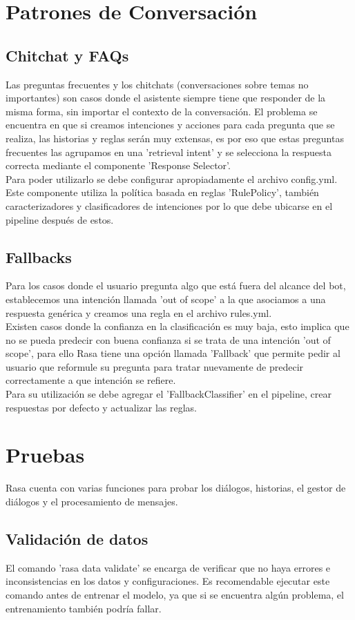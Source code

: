 \section{Patrones de Conversación}
\subsection{Chitchat y FAQs}
Las preguntas frecuentes y los chitchats (conversaciones sobre temas no importantes) son casos
donde el asistente siempre tiene que responder de la misma forma, sin importar el contexto de la
conversación. El problema se encuentra en que si creamos intenciones y acciones para cada pregunta
que se realiza, las historias y reglas serán muy extensas, es por eso que estas preguntas
frecuentes las agrupamos en una 'retrieval intent' y se selecciona la respuesta correcta mediante
el componente 'Response Selector'.\\
Para poder utilizarlo se debe configurar apropiadamente el archivo config.yml. Este componente
utiliza la política basada en reglas 'RulePolicy', también caracterizadores y clasificadores de
intenciones por lo que debe ubicarse en el pipeline después de estos.
\subsection{Fallbacks}
Para los casos donde el usuario pregunta algo que está fuera del alcance del bot, establecemos una
intención llamada 'out of scope' a la que asociamos a una respuesta genérica y creamos una regla en
el archivo rules.yml.\\ Existen casos donde la confianza en la clasificación es muy baja, esto
implica que no se pueda predecir con buena confianza si se trata de una intención 'out of scope',
para ello Rasa tiene una opción llamada 'Fallback' que permite pedir al usuario que reformule su
pregunta para tratar nuevamente de predecir correctamente a que intención se refiere. \\
Para su utilización se debe agregar el 'FallbackClassifier' en el pipeline, crear respuestas por
defecto y actualizar las reglas.
\section{Pruebas}
Rasa cuenta con varias funciones para probar los diálogos, historias, el gestor de diálogos y el
procesamiento de mensajes.
\subsection{Validación de datos}
El comando 'rasa data validate' se encarga de verificar que no haya errores e inconsistencias en
los datos y configuraciones. Es recomendable ejecutar este comando antes de entrenar el modelo, ya
que si se encuentra algún problema, el entrenamiento también podría fallar.
